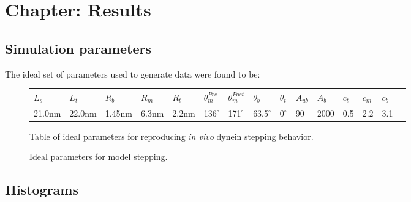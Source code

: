 \documentclass[10pt]{article} %
\begin{document}


\section{Chapter: Results}

\subsection{Simulation parameters}
The ideal set of parameters used to generate data were found to be:

\begin{figure}[h]
  \centering
  \begin{tabular}{| l | l | l | l | l | l | l | l | l | l | l | l | l | l | l |}
    \hline
    $L_s$ & $L_t$ & $R_b$ & $R_m$ & $R_t$ & $\theta_{m}^{Pre}$ & $\theta_{m}^{Post}$ & $\theta_{b}$ & $\theta_{t}$ & $A_{ub}$ & $A_b$ & $c_t$ & $c_m$  &$c_b$\\ \hline
    21.0nm & 22.0nm & 1.45nm & 6.3nm & 2.2nm & 136$^{\circ}$ & 171$^{\circ}$ & 63.5$^{\circ}$ & 0$^{\circ}$ & 90 & 2000 & 0.5 & 2.2  & 3.1\\ \hline
  \end{tabular}
  \caption{Ideal parameters for model stepping.}{Table of ideal parameters for reproducing \textit{in vivo} dynein stepping behavior.}
  \label{final-parameter-table}
\end{figure}

\subsection{Histograms}

\end{document}
